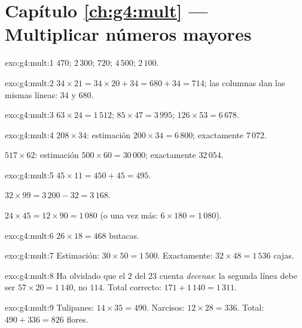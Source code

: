 \section*{Capítulo \ref{ch:g4:mult} --- Multiplicar números mayores}

\begin{solution}{exo:g4:mult:1}
$470$; \quad $2\,300$; \quad $720$; \quad $4\,500$; \quad
$2\,100$.
\end{solution}

\begin{solution}{exo:g4:mult:2}
$34 \times 21 = 34 \times 20 + 34 = 680 + 34 = 714$; las columnas
dan las mismas líneas: $34$ y $680$.
\end{solution}

\begin{solution}{exo:g4:mult:3}
$63 \times 24 = 1\,512$; \quad
$85 \times 47 = 3\,995$; \quad
$126 \times 53 = 6\,678$.
\end{solution}

\begin{solution}{exo:g4:mult:4}
$208 \times 34$: estimación $200 \times 34 = 6\,800$; exactamente
$7\,072$.

$517 \times 62$: estimación $500 \times 60 = 30\,000$; exactamente
$32\,054$.
\end{solution}

\begin{solution}{exo:g4:mult:5}
$45 \times 11 = 450 + 45 = 495$.

$32 \times 99 = 3\,200 - 32 = 3\,168$.

$24 \times 45 = 12 \times 90 = 1\,080$ (o una vez más:
$6 \times 180 = 1\,080$).
\end{solution}

\begin{solution}{exo:g4:mult:6}
$26 \times 18 = 468$ butacas.
\end{solution}

\begin{solution}{exo:g4:mult:7}
Estimación: $30 \times 50 = 1\,500$. Exactamente:
$32 \times 48 = 1\,536$ cajas.
\end{solution}

\begin{solution}{exo:g4:mult:8}
Ha olvidado que el $2$ del $23$ cuenta \emph{decenas}: la segunda línea
debe ser $57 \times 20 = 1\,140$, no $114$. Total correcto:
$171 + 1\,140 = 1\,311$.
\end{solution}

\begin{solution}{exo:g4:mult:9}
Tulipanes: $14 \times 35 = 490$. Narcisos: $12 \times 28 = 336$.
Total: $490 + 336 = 826$ flores.
\end{solution}


